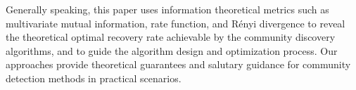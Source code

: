 \begin{abstract*}
  Generally speaking, this paper uses information theoretical metrics such as multivariate mutual information,
  rate function, and Rényi divergence to reveal the theoretical
  optimal recovery rate achievable by the community discovery algorithms,
  and to guide the algorithm design and optimization process.
  Our approaches provide theoretical guarantees and salutary guidance
  for community detection methods in practical scenarios.
\end{abstract*}
